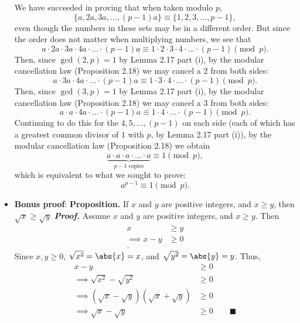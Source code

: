 \documentclass{report}
\begin{document}
\begin{itemize}
        \bigbreak \noindent 
        We have succeeded in proving that when taken modulo $p$,
        \[
            \{a, 2a, 3a, \dots, (p-1)a\} \equiv \{1, 2, 3, \dots, p-1\},
        \]
        even though the numbers in these sets may be in a different order. But since the order does not matter when multiplying numbers, we see that
        \[
            a \cdot 2a \cdot 3a \cdot 4a \cdot \dots \cdot (p-1)a \equiv 1 \cdot 2 \cdot 3 \cdot 4 \cdot \dots \cdot (p-1) \pmod{p}.
        \]
        Then, since $\gcd(2, p) = 1$ by Lemma 2.17 part (i), by the modular cancellation law (Proposition 2.18) we may cancel a $2$ from both sides:
        \[
            a \cdot 3a \cdot 4a \cdot \dots \cdot (p-1)a \equiv 1 \cdot 3 \cdot 4 \cdot \dots \cdot (p-1) \pmod{p}.
        \]
        Then, since $\gcd(3, p) = 1$ by Lemma 2.17 part (i), by the modular cancellation law (Proposition 2.18) we may cancel a $3$ from both sides:
        \[
            a \cdot a \cdot 4a \cdot \dots \cdot (p-1)a \equiv 1 \cdot 4 \cdot \dots \cdot (p-1) \pmod{p}.
        \]
        Continuing to do this for the $4, 5, \dots, (p-1)$ on each side (each of which has a greatest common divisor of $1$ with $p$, by Lemma 2.17 part (i)), by the modular cancellation law (Proposition 2.18) we obtain
        \[
            \underbrace{a \cdot a \cdot a \cdot \dots \cdot a}_{p-1 \text{ copies}} \equiv 1 \pmod{p},
        \]
        which is equivalent to what we sought to prove:
        \[
            a^{p-1} \equiv 1 \pmod{p}.
        \]
    \item \textbf{Bonus proof}:
        \bigbreak \noindent 
        \textbf{Proposition.} If $x$ and $y$ are positive integers, and $x \geq y$, then $\sqrt{x} \geq \sqrt{y} $
        \bigbreak \noindent 
        \textbf{\textit{Proof.}} Assume $x$ and $y$ are positive integers, and $x \geq y$. Then
        \begin{align*}
            x &\geq y \\
            \implies x -y & \geq 0  \\
        .\end{align*}
        Since $x,y \geq 0$, $\sqrt{x^{2}} = \abs{x} = x$, and $\sqrt{y^{2}} = \abs{y} = y $. Thus,
        \begin{align*}
            x-y &\geq 0 \\
            \implies \sqrt{x^{2}} - \sqrt{y^{2}} &\geq 0  \\
            \implies (\sqrt{x} - \sqrt{y})(\sqrt{x} + \sqrt{y}) &\geq 0 \\
            \implies \sqrt{x} - \sqrt{y} &\geq 0  \quad \quad \blacksquare

\end{align*}
\end{itemize}
\end{document}
